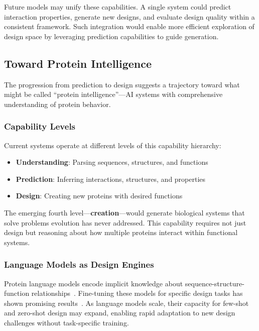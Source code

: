 Future models may unify these capabilities. A single system could predict interaction properties, generate new designs, and evaluate design quality within a consistent framework. Such integration would enable more efficient exploration of design space by leveraging prediction capabilities to guide generation.

\subsection{Toward Protein Intelligence}
\label{subsec:intelligence}

The progression from prediction to design suggests a trajectory toward what might be called ``protein intelligence''---AI systems with comprehensive understanding of protein behavior.

\subsubsection{Capability Levels}

Current systems operate at different levels of this capability hierarchy:

\begin{itemize}
    \item \textbf{Understanding}: Parsing sequences, structures, and functions~\cite{rives2021esm1b}
    \item \textbf{Prediction}: Inferring interactions, structures, and properties~\cite{jumper2021alphafold}
    \item \textbf{Design}: Creating new proteins with desired functions~\cite{watson2023rfdiffusion}
\end{itemize}

The emerging fourth level---\textbf{creation}---would generate biological systems that solve problems evolution has never addressed. This capability requires not just design but reasoning about how multiple proteins interact within functional systems.

\subsubsection{Language Models as Design Engines}

Protein language models encode implicit knowledge about sequence-structure-function relationships~\cite{lin2023esm2}. Fine-tuning these models for specific design tasks has shown promising results~\cite{dallago2024plmfinetune}. As language models scale, their capacity for few-shot and zero-shot design may expand, enabling rapid adaptation to new design challenges without task-specific training.

